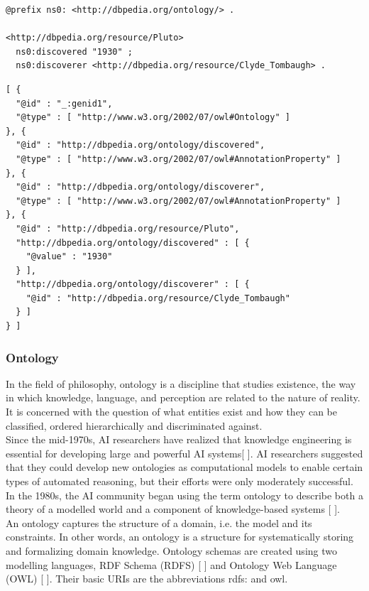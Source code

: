 \begin{lstlisting}[caption=Example of RDF Serialization in Turtle, label={lst:rdf-turtle}]
@prefix ns0: <http://dbpedia.org/ontology/> .

<http://dbpedia.org/resource/Pluto>
  ns0:discovered "1930" ;
  ns0:discoverer <http://dbpedia.org/resource/Clyde_Tombaugh> .
\end{lstlisting}

\begin{lstlisting}[caption=Example of RDF Serialization in JSON-LD, label={lst:rdf-json-ld}]
[ {
  "@id" : "_:genid1",
  "@type" : [ "http://www.w3.org/2002/07/owl#Ontology" ]
}, {
  "@id" : "http://dbpedia.org/ontology/discovered",
  "@type" : [ "http://www.w3.org/2002/07/owl#AnnotationProperty" ]
}, {
  "@id" : "http://dbpedia.org/ontology/discoverer",
  "@type" : [ "http://www.w3.org/2002/07/owl#AnnotationProperty" ]
}, {
  "@id" : "http://dbpedia.org/resource/Pluto",
  "http://dbpedia.org/ontology/discovered" : [ {
    "@value" : "1930"
  } ],
  "http://dbpedia.org/ontology/discoverer" : [ {
    "@id" : "http://dbpedia.org/resource/Clyde_Tombaugh"
  } ]
} ]
\end{lstlisting}

    \subsubsection{Ontology}
    In the field of philosophy, ontology is a discipline that studies existence, the way in which knowledge, language, and perception are related to the nature of reality. It is concerned with the question of what entities exist and how they can be classified, ordered hierarchically and discriminated against. \\
    Since the mid-1970s, AI researchers have realized that knowledge engineering is essential for developing large and powerful AI systems[ ]. AI researchers suggested that they could develop new ontologies as computational models to enable certain types of automated reasoning, but their efforts were only moderately successful. In the 1980s, the AI community began using the term ontology to describe both a theory of a modelled world and a component of knowledge-based systems [ ].\\
    An ontology captures the structure of a domain, i.e. the model and its constraints. In other words, an ontology is a structure for systematically storing and formalizing domain knowledge. Ontology schemas are created using two modelling languages, RDF Schema (RDFS) [ ] and Ontology Web Language (OWL) [ ]. Their basic URIs are the abbreviations rdfs: and owl.\\

